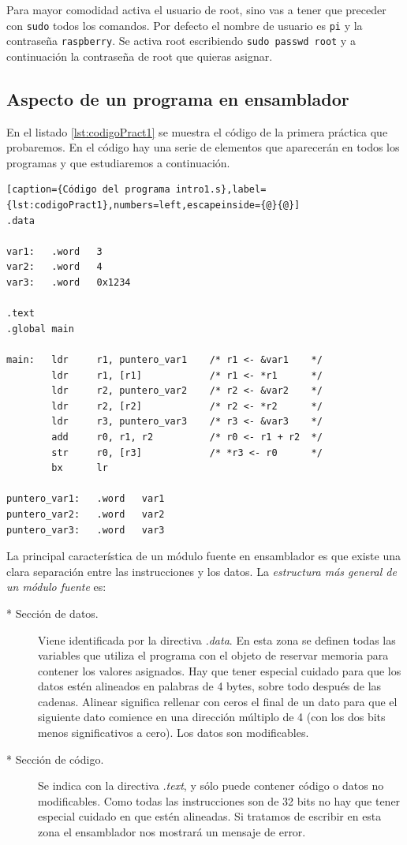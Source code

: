 Para mayor comodidad activa el usuario de root, sino vas a tener que preceder
con {\tt sudo} todos los comandos. Por defecto el nombre de usuario es
{\tt pi} y la contraseña {\tt raspberry}. Se activa root escribiendo
{\tt sudo passwd root} y a continuación la contraseña de root que quieras
asignar.

\subsection{Aspecto de un programa en ensamblador}

En el listado \ref{lst:codigoPract1} se muestra el código de la primera
práctica que probaremos. En el código hay una serie de elementos que
aparecerán en todos los programas y que estudiaremos a continuación.

\begin{lstlisting}[caption={Código del programa intro1.s},label={lst:codigoPract1},numbers=left,escapeinside={@}{@}]
.data

var1:   .word   3
var2:   .word   4
var3:   .word   0x1234

.text
.global main
 
main:   ldr     r1, puntero_var1    /* r1 <- &var1    */
        ldr     r1, [r1]            /* r1 <- *r1      */
        ldr     r2, puntero_var2    /* r2 <- &var2    */
        ldr     r2, [r2]            /* r2 <- *r2      */
        ldr     r3, puntero_var3    /* r3 <- &var3    */
        add     r0, r1, r2          /* r0 <- r1 + r2  */
        str     r0, [r3]            /* *r3 <- r0      */
        bx      lr

puntero_var1:   .word   var1
puntero_var2:   .word   var2
puntero_var3:   .word   var3
\end{lstlisting}

La principal característica de un módulo fuente en ensamblador es
que existe una clara separación entre las instrucciones y los
datos. La {\it estructura más general de un módulo fuente} es:

\begin{description}
     \item[* Sección de datos.] Viene identificada por la directiva {\it .data}.
En esta zona se definen todas las variables que utiliza el programa
con el objeto de reservar memoria para contener los valores asignados. Hay que
tener especial cuidado para que los datos estén alineados en palabras de 4 bytes,
sobre todo después de las cadenas. Alinear significa rellenar con ceros el final
de un dato para que el siguiente dato comience en una dirección múltiplo de 4 (con
los dos bits menos significativos a cero). Los datos son modificables.

     \item[* Sección de código.] Se indica con la directiva {\it .text}, y sólo
puede contener código o datos no modificables. Como todas las instrucciones son
de 32 bits no hay que tener especial cuidado en que estén alineadas. Si tratamos
de escribir en esta zona el ensamblador nos mostrará un mensaje de error.
\end{description}

